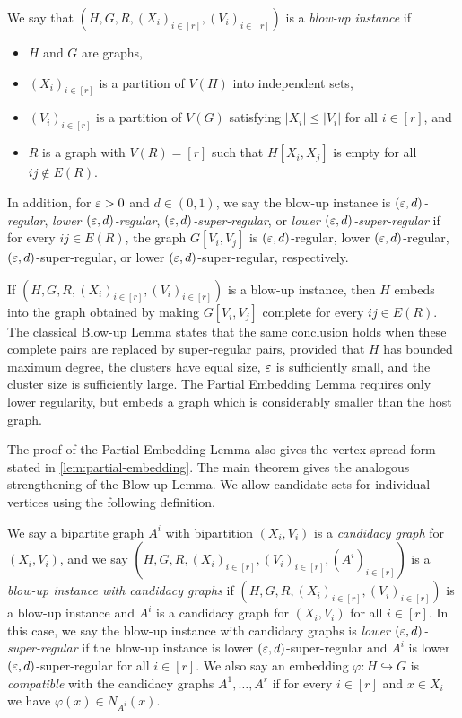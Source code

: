 \documentclass[11pt]{amsart}
\begin{document}
\begin{definition}
    We say that $\left(H, G, R, (X_i)_{i\in [r]}, (V_i)_{i\in [r]}\right)$ is a \textit{blow-up instance} if 
\begin{itemize}
    \item $H$ and $G$ are graphs,
    \item $(X_i)_{i \in [r]}$ is a partition of $V(H)$ into independent sets,
    \item $(V_i)_{i \in [r]}$ is a partition of $V(G)$ satisfying $|X_i| \leq |V_i|$ for all $i \in [r]$, and
    \item $R$ is a graph with $V(R) = [r]$ such that $H[X_i, X_j]$ is empty for all $ij \notin E(R)$.    
\end{itemize}
In addition, for $\varepsilon > 0$ and $d \in (0, 1)$, we say the blow-up instance is \textit{$(\varepsilon, d)$-regular}, \textit{lower $(\varepsilon, d)$-regular}, \textit{$(\varepsilon, d)$-super-regular}, or \textit{lower $(\varepsilon, d)$-super-regular} if for every $ij \in E(R)$, the graph $G[V_i, V_j]$ is $(\varepsilon, d)$-regular, lower $(\varepsilon, d)$-regular, $(\varepsilon, d)$-super-regular, or lower $(\varepsilon, d)$-super-regular, respectively. 
\end{definition}

If $(H,G,R,(X_i)_{i\in[r]},(V_i)_{i\in[r]})$ is a blow-up instance, then
$H$ embeds into the graph obtained by making $G[V_i,V_j]$ complete for every
$ij\in E(R)$.  The classical Blow-up Lemma states that the same conclusion
holds when these complete pairs are replaced by super-regular pairs, provided
that $H$ has bounded maximum degree, the clusters have equal size, $\varepsilon$ is
sufficiently small, and the cluster size is sufficiently large.  The Partial
Embedding Lemma requires only lower regularity, but embeds a graph which is
considerably smaller than the host graph.

The proof of the Partial Embedding Lemma also gives the vertex-spread form
stated in \cref{lem:partial-embedding}.  The main theorem gives the analogous
strengthening of the Blow-up Lemma.  We allow candidate sets for individual
vertices using the following definition.

\begin{definition}
    We say a bipartite graph $A^i$ with bipartition $(X_i, V_i)$ is a \textit{candidacy graph} for $(X_i, V_i)$, and we say $(H, G, R, (X_i)_{i\in [r]},\allowbreak (V_i)_{i\in [r]}, (A^i)_{i\in[r]})$ is a \textit{blow-up instance with candidacy graphs} if $(H, G, R,\allowbreak (X_i)_{i\in [r]},\allowbreak (V_i)_{i\in [r]})$ is a blow-up instance and $A^i$ is a candidacy graph for $(X_i, V_i)$ for all $i \in [r]$.  In this case, we say the blow-up instance with candidacy graphs is \textit{lower $(\varepsilon, d)$-super-regular} if the blow-up instance is lower $(\varepsilon, d)$-super-regular and $A^i$ is lower $(\varepsilon, d)$-super-regular for all $i \in [r]$.  We also say an embedding $\varphi : H \hookrightarrow G$ is \textit{compatible} with the candidacy graphs $A^1, \dots, A^r$ if for every $i \in [r]$ and $x \in X_i$ we have $\varphi(x) \in N_{A^i}(x)$.
\end{definition}
\end{document}
